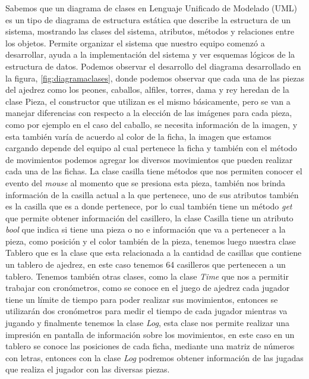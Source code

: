 \documentclass[conference]{IEEEtran}
\newcommand\tab[1][1cm]{\hspace*{#1}}
\begin{document}
        Sabemos que un diagrama de clases en Lenguaje Unificado de Modelado (UML) es un tipo de diagrama de estructura estática que describe la estructura de un sistema, mostrando las clases del sistema, atributos, métodos y relaciones entre los objetos.
        \newline
        \newline
        \tab[0.55cm] Permite organizar el sistema que nuestro equipo comenzó a desarrollar, ayuda a la implementación del sistema y ver esquemas lógicos de la estructura de datos.
        \newline
        \newline
        \tab[0.55cm] Podemos observar el desarrollo del diagrama desarrollado en la figura, \ref{fig:diagramaclases}, donde podemos observar que cada una de las piezas del ajedrez como los peones, caballos, alfiles, torres, dama y rey heredan de la clase Pieza, el constructor que utilizan es el mismo básicamente, pero se van a manejar diferencias con respecto a la elección de las imágenes para cada pieza, como por ejemplo en el caso del caballo, se necesita información de la imagen, y esta también varía de acuerdo al color de la ficha, la imagen que estamos cargando depende del equipo al cual pertenece la ficha y también con el método de movimientos podemos agregar los diversos movimientos que pueden realizar cada una de las fichas. 
        \newline
        \newline
        \tab[0.55cm] La clase casilla tiene métodos que nos permiten conocer el evento del \textit{mouse} al momento que se presiona esta pieza, también nos brinda información de la casilla actual a la que pertenece, uno de sus atributos también es la casilla que es a donde pertenece, por lo cual también tiene un método \textit{get} que permite obtener información del casillero, la clase Casilla tiene un atributo  \textit{bool} que indica si tiene una pieza o no e información que va a pertenecer a la pieza, como posición y el color también de la pieza, tenemos luego nuestra clase Tablero que es la clase que esta relacionada a la cantidad de casillas que contiene un tablero de ajedrez, en este caso tenemos 64 casilleros que pertenecen a un tablero. 
        \newline
        \newline
        \tab[0.55cm] Tenemos también otras clases, como la clase \textit{Time} que nos a permitir trabajar con cronómetros, como se conoce en el juego de ajedrez cada jugador tiene un límite de tiempo para poder realizar sus movimientos, entonces se utilizarán dos cronómetros para medir el tiempo de cada jugador mientras va jugando y finalmente tenemos la clase \textit{Log}, esta clase nos permite realizar una impresión en pantalla de información sobre los movimientos, en este caso en un tablero se conoce las posiciones de cada ficha, mediante una matriz de números con letras, entonces con la clase \textit{Log} podremos obtener información de las jugadas que realiza el jugador con las diversas piezas.
        
\end{document}
